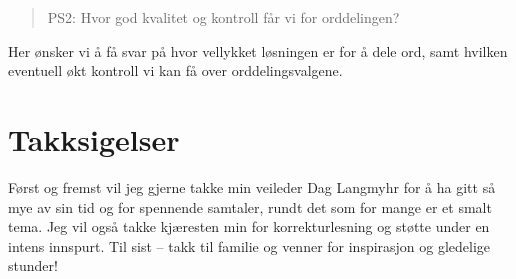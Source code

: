 \begin{quote}
PS2: Hvor god kvalitet og kontroll får vi for orddelingen?
\end{quote}

Her ønsker vi å få svar på hvor vellykket løsningen er for å dele ord, samt hvilken eventuell økt kontroll vi kan få over orddelingsvalgene.

\section*{Takksigelser}

Først og fremst vil jeg gjerne takke min veileder Dag Langmyhr for å ha gitt så mye av sin tid og for spennende samtaler, rundt det som for mange er et smalt tema. Jeg vil også takke kjæresten min for korrekturlesning og støtte under en intens innspurt. Til sist -- takk til familie og venner for inspirasjon og gledelige stunder!